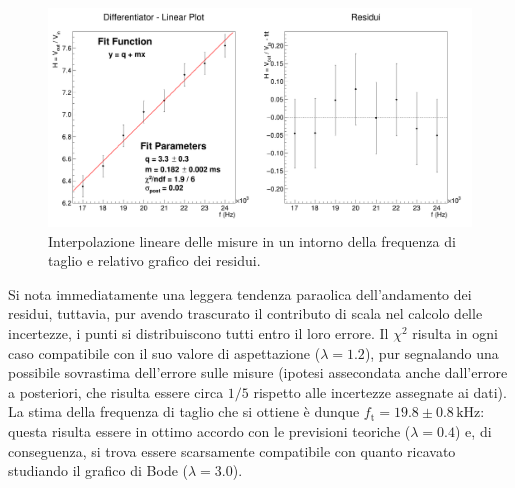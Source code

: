 \documentclass[a4paper,11pt]{article} %
\begin{document}
\begin{figure}[H]
	\centering
	\includegraphics[width=\linewidth]{../Plots/Report_Plots/diff_linear.png}
	\caption{\small Interpolazione lineare delle misure in un intorno della frequenza di taglio e relativo grafico dei residui.}
	\label{i:diff_linear}
\end{figure}

\noindent Si nota immediatamente una leggera tendenza paraolica dell'andamento dei residui, tuttavia, pur avendo
trascurato il contributo di scala nel calcolo delle incertezze, i punti si distribuiscono tutti entro il loro errore. Il
$\chi^2$ risulta in ogni caso compatibile con il suo valore di aspettazione ($\lambda = 1.2$), pur segnalando una
possibile sovrastima dell'errore sulle misure (ipotesi assecondata anche dall'errore a posteriori, che risulta essere
circa $1/5$ rispetto alle incertezze assegnate ai dati). La stima della frequenza di taglio che si ottiene è dunque
$f_{\text{t}} = 19.8\pm 0.8\,\si{\kHz}$: questa risulta essere in ottimo accordo con le previsioni teoriche
($\lambda=0.4$) e, di conseguenza, si trova essere scarsamente compatibile con quanto ricavato studiando il grafico di
Bode ($\lambda = 3.0$).


\end{document}
